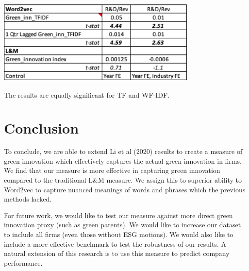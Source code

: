 \documentclass[10pt]{article}
\begin{document}
\includegraphics[height=5cm, width=10cm]{validation.png}\\
The results are equally significant for TF and WF-IDF.
 
\section{Conclusion}
To conclude, we are able to extend Li et al (2020) results to create a measure of green innovation which effectively captures the actual green innovation in firms. We find that our measure is more effective in capturing green innovation compared to the traditional L\&M measure. We assign this to superior ability to Word2vec to capture nuanced meanings of words and phrases which the previous methods lacked.

For future work, we would like to test our measure against more direct green innovation proxy (such as green patents). We would like to increase our dataset to include all firms (even those without ESG motions). We would also like to include a more effective benchmark to test the robustness of our results. A natural extension of this research is to use this measure to predict company performance.
\end{document}
